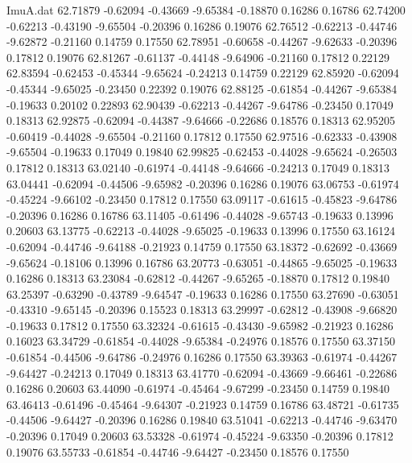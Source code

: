 \begin{filecontents}{ImuA.dat}
  62.71879   -0.62094   -0.43669   -9.65384   -0.18870    0.16286    0.16786
  62.74200   -0.62213   -0.43190   -9.65504   -0.20396    0.16286    0.19076
  62.76512   -0.62213   -0.44746   -9.62872   -0.21160    0.14759    0.17550
  62.78951   -0.60658   -0.44267   -9.62633   -0.20396    0.17812    0.19076
  62.81267   -0.61137   -0.44148   -9.64906   -0.21160    0.17812    0.22129
  62.83594   -0.62453   -0.45344   -9.65624   -0.24213    0.14759    0.22129
  62.85920   -0.62094   -0.45344   -9.65025   -0.23450    0.22392    0.19076
  62.88125   -0.61854   -0.44267   -9.65384   -0.19633    0.20102    0.22893
  62.90439   -0.62213   -0.44267   -9.64786   -0.23450    0.17049    0.18313
  62.92875   -0.62094   -0.44387   -9.64666   -0.22686    0.18576    0.18313
  62.95205   -0.60419   -0.44028   -9.65504   -0.21160    0.17812    0.17550
  62.97516   -0.62333   -0.43908   -9.65504   -0.19633    0.17049    0.19840
  62.99825   -0.62453   -0.44028   -9.65624   -0.26503    0.17812    0.18313
  63.02140   -0.61974   -0.44148   -9.64666   -0.24213    0.17049    0.18313
  63.04441   -0.62094   -0.44506   -9.65982   -0.20396    0.16286    0.19076
  63.06753   -0.61974   -0.45224   -9.66102   -0.23450    0.17812    0.17550
  63.09117   -0.61615   -0.45823   -9.64786   -0.20396    0.16286    0.16786
  63.11405   -0.61496   -0.44028   -9.65743   -0.19633    0.13996    0.20603
  63.13775   -0.62213   -0.44028   -9.65025   -0.19633    0.13996    0.17550
  63.16124   -0.62094   -0.44746   -9.64188   -0.21923    0.14759    0.17550
  63.18372   -0.62692   -0.43669   -9.65624   -0.18106    0.13996    0.16786
  63.20773   -0.63051   -0.44865   -9.65025   -0.19633    0.16286    0.18313
  63.23084   -0.62812   -0.44267   -9.65265   -0.18870    0.17812    0.19840
  63.25397   -0.63290   -0.43789   -9.64547   -0.19633    0.16286    0.17550
  63.27690   -0.63051   -0.43310   -9.65145   -0.20396    0.15523    0.18313
  63.29997   -0.62812   -0.43908   -9.66820   -0.19633    0.17812    0.17550
  63.32324   -0.61615   -0.43430   -9.65982   -0.21923    0.16286    0.16023
  63.34729   -0.61854   -0.44028   -9.65384   -0.24976    0.18576    0.17550
  63.37150   -0.61854   -0.44506   -9.64786   -0.24976    0.16286    0.17550
  63.39363   -0.61974   -0.44267   -9.64427   -0.24213    0.17049    0.18313
  63.41770   -0.62094   -0.43669   -9.66461   -0.22686    0.16286    0.20603
  63.44090   -0.61974   -0.45464   -9.67299   -0.23450    0.14759    0.19840
  63.46413   -0.61496   -0.45464   -9.64307   -0.21923    0.14759    0.16786
  63.48721   -0.61735   -0.44506   -9.64427   -0.20396    0.16286    0.19840
  63.51041   -0.62213   -0.44746   -9.63470   -0.20396    0.17049    0.20603
  63.53328   -0.61974   -0.45224   -9.63350   -0.20396    0.17812    0.19076
  63.55733   -0.61854   -0.44746   -9.64427   -0.23450    0.18576    0.17550
\end{filecontents}

